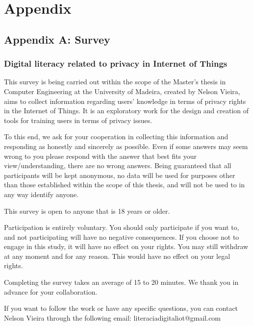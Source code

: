 %
%
\chapter*[Appendix]{Appendix}

\section*[Appendix A]{Appendix A: Survey}\label{appendix:survey}

\subsection*{Digital literacy related to privacy in Internet of Things}

This survey is being carried out within the scope of the Master's thesis in
Computer Engineering at the University of Madeira, created by Nelson Vieira,
aims to collect information regarding users' knowledge in terms of privacy rights
in the Internet of Things. It is an exploratory work for the design and creation
of tools for training users in terms of privacy issues.

To this end, we ask for your cooperation in collecting this information and
responding as honestly and sincerely as possible. Even if some answers may
seem wrong to you please respond with the answer that best fits your view/understanding,
there are no wrong answers. Being guaranteed that all participants will be kept
anonymous, no data will be used for purposes other than those established within
the scope of this thesis, and will not be used to in any way identify anyone.

This survey is open to anyone that is 18 years or older.

Participation is entirely voluntary. You should only participate if you want
to, and not participating will have no negative consequences. If you choose
not to engage in this study, it will have no effect on your rights. You may
still withdraw at any moment and for any reason. This would have no effect
on your legal rights.

Completing the  survey takes an average of 15 to 20 minutes. We thank you in
advance for your collaboration.

If you want to follow the work or have any specific questions, you can contact
Nelson Vieira through the following email: literaciadigitaliot@gmail.com

